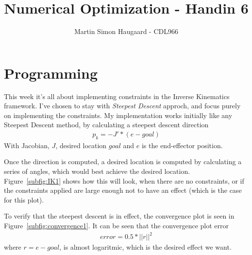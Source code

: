 \documentclass[11pt]{article} %
\title{Numerical Optimization - Handin 6}
\author{Martin Simon Haugaard - CDL966}
\begin{document}
\maketitle
\section{Programming}
This week it's all about implementing constraints in the Inverse Kinematics framework. I've chosen to stay with \textit{Steepest Descent} approch, and focus purely on implementing the constraints. My implementation works initially like any Steepest Descent method, by calculating a steepest descent direction
\begin{gather*}
p_k = -J'*(e-goal)
\end{gather*}
With Jacobian, $J$, desired location $goal$ and $e$ is the end-effector position.

Once the direction is computed, a desired location is computed by calculating a series of angles, which would best achieve the desired location. Figure~\ref{subfig:IK1} shows how this will look, when there are no constraints, or if the constraints applied are large enough not to have an effect (which is the case for this plot).
\begin{figure}[h!]
    \hfill
\caption{}
\label{fig:IK1}
\end{figure}
To verify that the steepest descent is in effect, the convergence plot is seen in Figure~\ref{subfig:convergence1}. It can be seen that the convergence plot error
\begin{gather*}
    error      = 0.5*||r||^2
\end{gather*}
where $r = e-goal$, is almost logaritmic, which is the desired effect we want.
\end{document}
